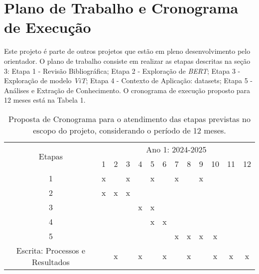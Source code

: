 \section{Plano de Trabalho e Cronograma de Execução}

Este projeto é parte de outros projetos que estão em pleno desenvolvimento pelo orientador. O plano de trabalho consiste em realizar as etapas descritas na seção 3: Etapa 1 - Revisão Bibliográfica; Etapa 2 - Exploração de \textit{BERT}; Etapa 3 - Exploração de modelo \textit{ViT}; Etapa 4 - Contexto de Aplicação: datasets; Etapa 5 - Análises e Extração de Conhecimento. O cronograma de execução proposto para 12 meses está na Tabela 1. 
\begin{table}[h]

\caption{Proposta de Cronograma para o atendimento das etapas previstas no escopo do projeto, considerando o período de 12 meses.}

\label{tab:cronograma}
	\centering
		\begin{tabular} {|c|c|c|c|c|c|c|c|c|c|c|c|c|}
		\hline
		\multirow{2}{*}{Etapas}
		&\multicolumn{12}{c|}{Ano 1: 2024-2025}\\ \cline{2-13}
		&1&2&3&4&5&6&7&8&9&10&11&12\\
		\hline
		1&x&&x&&x&&x&&x&&&\\
		\hline
		2&x&x&x&&&&&&&&&\\
		\hline	
		3&&&&x&x&&&&&&&\\
		\hline			
		4&&&&&x&x&&&&&&\\
		\hline	
		5&&&&&&&x&x&x&x&&\\
		\hline	
		

		Escrita: Processos e Resultados&&x&&x&&x&&x&&x&x&x\\
		\hline
		\end{tabular}
\end{table}
